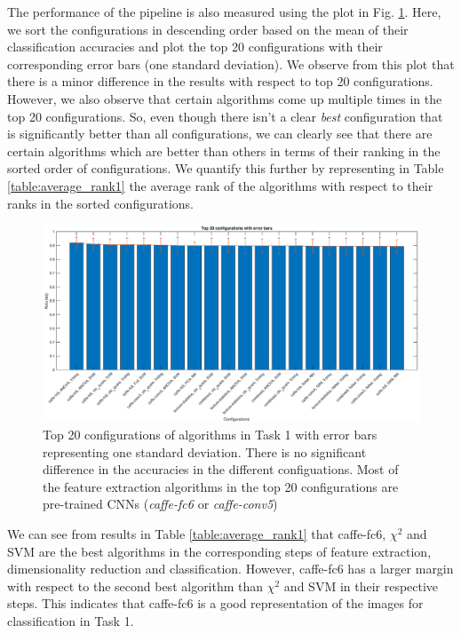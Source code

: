The performance of the pipeline is also measured using the plot in Fig. \ref{fig:error_bars1}. Here, we sort the configurations in descending order based on the mean of their classification accuracies and plot the top 20 configurations with their corresponding error bars (one standard deviation).  We observe from this plot that there is a minor difference in the results with respect to top 20 configurations. However, we also observe that certain algorithms come up multiple times in the top 20 configurations. So, even though there isn't a clear \textit{best} configuration that is significantly better than all configurations, we can clearly see that there are certain algorithms which are better than others in terms of their ranking in the sorted order of configurations. We quantify this further by representing in Table \ref{table:average_rank1} the average rank of the algorithms with respect to their ranks in the sorted configurations. 
\begin{figure}[ht!]
  \begin{centering}
 \includegraphics[scale=0.4]{img/best_matsc_error_bars.eps}
 \caption{Top 20 configurations of algorithms in Task 1 with error bars representing one standard deviation. There is no significant difference in the accuracies in the different configuations. Most of the feature extraction algorithms in the top 20 configurations are pre-trained CNNs (\textit{caffe-fc6} or \textit{caffe-conv5})}
 \label{fig:error_bars1}
 \end{centering}
\end{figure}

We can see from results in Table \ref{table:average_rank1} that caffe-fc6, $\chi^2$ and SVM are the best algorithms in the corresponding steps of feature extraction, dimensionality reduction and classification. However, caffe-fc6 has a larger margin with respect to the second best algorithm than $\chi^2$ and SVM in their respective steps. This indicates that caffe-fc6 is a good representation of the images for classification in Task 1.

